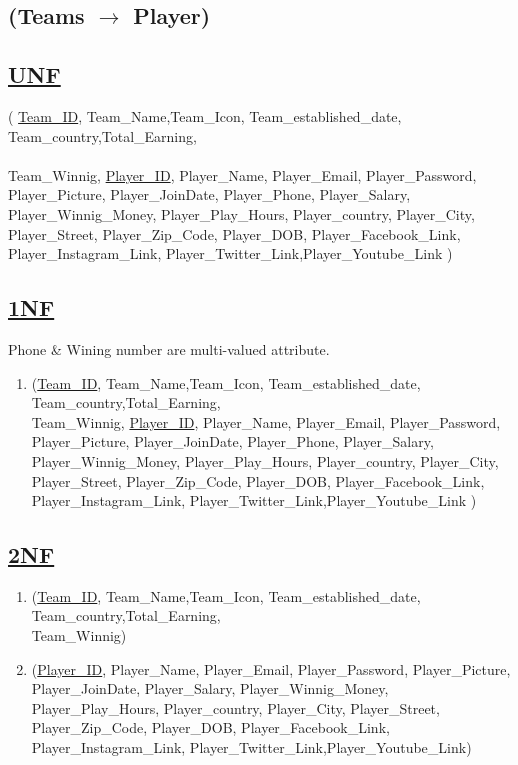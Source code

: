 \subsection{\texorpdfstring{\centering (Teams $\rightarrow$ Player)}{ (Teams - Player)}}


\subsection*{\underline{UNF}}
(
\underline{Team\_ID}, Team\_Name,Team\_Icon, Team\_established\_date, Team\_country,Total\_Earning,\\\\Team\_Winnig,
\underline{Player\_ID}, Player\_Name, Player\_Email, Player\_Password, Player\_Picture, Player\_JoinDate, Player\_Phone, Player\_Salary, Player\_Winnig\_Money, Player\_Play\_Hours, Player\_country, Player\_City, Player\_Street, Player\_Zip\_Code, Player\_DOB,
Player\_Facebook\_Link, Player\_Instagram\_Link,
Player\_Twitter\_Link,Player\_Youtube\_Link
)

\subsection*{\underline{1NF}}
Phone \& Wining number are multi-valued attribute.
\vskip 0.2in

\begin{enumerate}
    \item
          (\underline{Team\_ID}, Team\_Name,Team\_Icon, Team\_established\_date, Team\_country,Total\_Earning,\\Team\_Winnig,
          \underline{Player\_ID}, Player\_Name, Player\_Email, Player\_Password, Player\_Picture, Player\_JoinDate, Player\_Phone, Player\_Salary, Player\_Winnig\_Money, Player\_Play\_Hours, Player\_country, Player\_City, Player\_Street, Player\_Zip\_Code, Player\_DOB,
          Player\_Facebook\_Link, Player\_Instagram\_Link,
          Player\_Twitter\_Link,Player\_Youtube\_Link
          )
\end{enumerate}

\subsection*{\underline{2NF}}
\begin{enumerate}
    \item (\underline{Team\_ID}, Team\_Name,Team\_Icon, Team\_established\_date, Team\_country,Total\_Earning,\\Team\_Winnig)
    \item (\underline{Player\_ID}, Player\_Name, Player\_Email, Player\_Password, Player\_Picture, Player\_JoinDate, Player\_Salary, Player\_Winnig\_Money, Player\_Play\_Hours, Player\_country, Player\_City, Player\_Street, Player\_Zip\_Code, Player\_DOB, Player\_Facebook\_Link, Player\_Instagram\_Link, Player\_Twitter\_Link,Player\_Youtube\_Link)
\end{enumerate}


